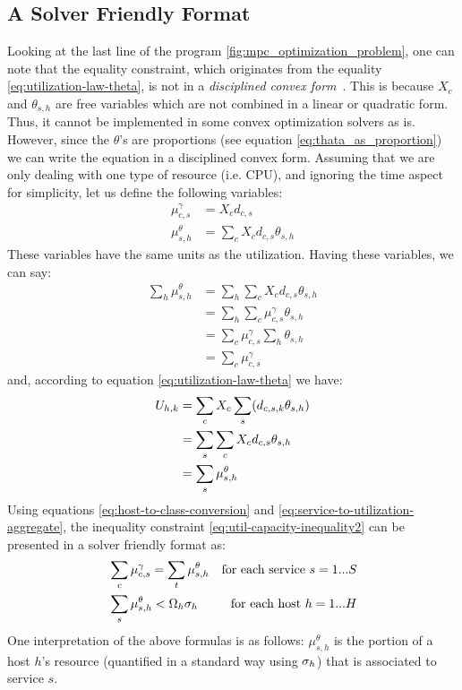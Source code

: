   \subsection{A Solver Friendly Format}  
 Looking at the last line of the program \ref{fig:mpc_optimization_problem}, one can note that the equality constraint, which originates from the equality \ref{eq:utilization-law-theta}, is not in a \textit{disciplined convex form}~\cite{cvx}. This is because $X_{c}$ and $\theta_{s,h}$ are free variables which are not combined in a linear or quadratic form.   
  Thus, it cannot be implemented in some convex optimization solvers as is. However, since the $\theta$'s are proportions (see equation \ref{eq:thata_as_proportion})  we can write the equation in a disciplined convex form. Assuming that we are only dealing with one type of resource (i.e. CPU), and ignoring the time aspect for simplicity, let us define the following variables:  
\begin{align}  
  \mu_{c,s}^\gamma &= X_c d_{c,s}   \nonumber \\
  \mu_{s,h}^\theta  &= \sum_c X_c d_{c,s} \theta_{s,h} \nonumber 
\end{align}  
  These variables have the same units as the utilization. 
   Having these variables, we can say:
   \begin{align} \label{eq:host-to-class-conversion}
 \sum_h \mu_{s,h}^\theta
 &= \sum_h \sum_c X_c d_{c,s} \theta_{s,h}  \nonumber \\
 &=\sum_h \sum_c \mu_{c,s}^\gamma  \theta_{s,h} \nonumber \\
 &= \sum_c \mu_{c,s}^\gamma  \sum_h  \theta_{s,h}  \nonumber \\
 &= \sum_c \mu_{c,s}^\gamma  
 \end{align}  
and, according to equation \ref{eq:utilization-law-theta} we have:  
\begin{align} \label{eq:service-to-utilization-aggregate}
   U_{h,k} 
    &= \sum_c X_{c}  \sum_{s} (d_{c,s,k}\theta_{s,h})  \nonumber \\   
    &= \sum_s \sum_c X_c d_{c,s} \theta_{s,h}  \nonumber \\
    &= \sum_s \mu_{s,h}^\theta 
 \end{align}
 Using equations \ref{eq:host-to-class-conversion} and \ref{eq:service-to-utilization-aggregate}, the inequality constraint \ref{eq:util-capacity-inequality2} can be presented in a solver friendly format as:   
\begin{align} 
 & \sum_c \mu_{c,s}^\gamma  = \sum_t \mu_{s,h}^\theta  
 &  \text{for each service $s=1...S$} \\
 & \sum_s \mu_{s,h}^\theta  < \Omega_h \sigma_h  
 &  \text{for each host $h=1...H$} 
\end{align}  
 One interpretation of the above formulas is as follows: $\mu_{s,h}^\theta$ is the  portion of a host $h$'s resource (quantified in a standard way using $\sigma_h$) that is associated to service $s$.  

